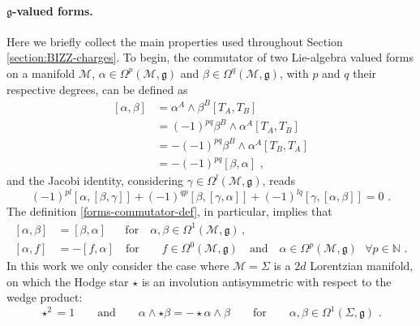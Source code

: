 \documentclass[12pt]{article}
\numberwithin{equation}{section}
\begin{document}
\paragraph{$\mathfrak{g}$-valued forms.}
Here we briefly collect the main properties used throughout Section \ref{section:BIZZ-charges}.
To begin, the commutator of two Lie-algebra valued forms on a manifold $\mathcal{M}$, $\alpha\in \Omega^{p}(\mathcal{M},\mathfrak{g})$ and $\beta\in \Omega^{q}(\mathcal{M},\mathfrak{g})$, with $p$ and $q$ their respective degrees, can be defined as
\begin{equation}\label{forms-commutator-def}
\begin{aligned}
[\alpha,\beta] &=\alpha^{A}\wedge\beta^{B}[T_{A},T_{B}]
\\
&=(-1)^{pq}\beta^{B}\wedge \alpha^{A}[T_{A},T_{B}]
\\
&=-(-1)^{pq}\beta^{B}\wedge \alpha^{A}[T_{B},T_{A}]
\\
&=-(-1)^{pq}[\beta,\alpha] \,\, ,
\end{aligned}
\end{equation}
and the Jacobi identity, considering $\gamma\in \Omega^{l}(\mathcal{M},\mathfrak{g})$, reads
\begin{equation}\label{Jacobi-forms}
(-1)^{pl}[\alpha,[\beta,\gamma]]+(-1)^{qp}[\beta,[\gamma,\alpha]]+(-1)^{lq}[\gamma,[\alpha,\beta]]=0 \,\, .
\end{equation}
The definition \eqref{forms-commutator-def}, in particular, implies that
\begin{equation}\label{form-commutator-relations}
\begin{aligned}
[\alpha,\beta]&=[\beta,\alpha] \quad\,\,\,\, \text{for} \quad \alpha,\beta \in \Omega^{1}(\mathcal{M},\mathfrak{g}) \, ,
\\
[\alpha,f]&=-[f,\alpha] 
\quad \text{for} \quad \,\,\,\,\,\,
f\in\Omega^{0}(\mathcal{M},\mathfrak{g}) 
\quad \text{and} \quad 
\alpha\in \Omega^{p}(\mathcal{M},\mathfrak{g}) \,\,\,\, \forall p\in\mathbb{N} \,\, .
\end{aligned}
\end{equation}
In this work we only consider the case where $\mathcal{M} = \Sigma$ is a $2d$ Lorentzian manifold, on which the Hodge star $\star$ is an involution antisymmetric with respect to the wedge product:
\begin{equation}\label{properties-Hodge-star}
\star^2=1 
\qquad \text{and} \qquad 
\alpha \wedge \star \beta =-\star\alpha \wedge \beta \qquad \text{for} \qquad \alpha,\beta \in \Omega^{1}(\Sigma,\mathfrak{g}) \,\, .
\end{equation} 
\end{document}
